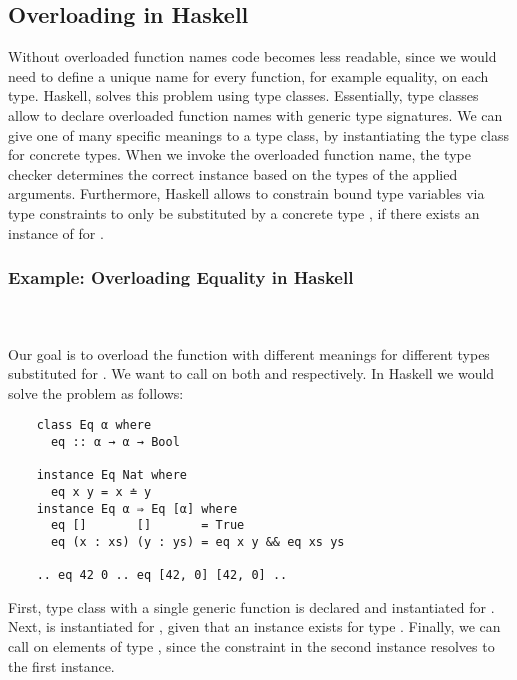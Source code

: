 \subsection{Overloading in Haskell}
Without overloaded function names code becomes less readable, since we would need to define a unique name for every function, for example equality, on each type.
Haskell, solves this problem using type classes.
Essentially, type classes allow to declare overloaded function names with generic type signatures.
We can give one of many specific meanings to a type class, by instantiating the type class for concrete types.
When we invoke the overloaded function name, the type checker determines the correct instance based on the types of the applied arguments. 
Furthermore, Haskell allows to constrain bound type variables  via type constraints  to only be substituted by a concrete type , if there exists an instance of  for . 

\subsubsection{Example: Overloading Equality in Haskell}\hfill\\\\
Our goal is to overload the function  with different meanings for different types substituted for .
We want to call  on both  and \inl{[Nat]} respectively. 
In Haskell we would solve the problem as follows:
\begin{verbatim}
    class Eq α where
      eq :: α → α → Bool 

    instance Eq Nat where
      eq x y = x ≐ y
    instance Eq α ⇒ Eq [α] where
      eq []       []       = True
      eq (x : xs) (y : ys) = eq x y && eq xs ys 

    .. eq 42 0 .. eq [42, 0] [42, 0] ..
\end{verbatim}
First, type class  with a single generic function  is declared and instantiated for . 
Next,  is instantiated for \inl{[α]}, given that an instance  exists for type . 
Finally, we can call  on elements of type \inl{[Nat]}, since the constraint  in the second instance resolves to the first instance.

